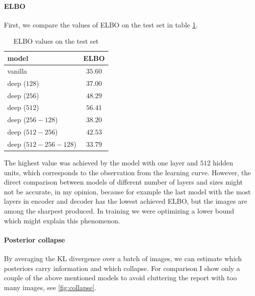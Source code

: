 \documentclass[a4paper,11pt]{article}
\begin{document}
\paragraph{ELBO} First, we compare the values of ELBO on the test set in table \ref{tab:elbo}.

\begin{table}[ht]
    \centering
    \begin{tabular}{| l | c |}
        \hline
        \textbf{model}       & \textbf{ELBO} \\
        \hline
        \hline
        vanilla              & $35.60$       \\
        \hline
        deep ($128$)         & $37.00$       \\
        \hline
        deep ($256$)         & $48.29$       \\
        \hline
        deep ($512$)         & $56.41$       \\
        \hline
        deep ($256-128$)     & $38.20$       \\
        \hline
        deep ($512-256$)     & $42.53$       \\
        \hline
        deep ($512-256-128$) & $33.79$       \\
        \hline
    \end{tabular}
    \caption{ELBO values on the test set}
    \label{tab:elbo}
\end{table}

The highest value was achieved by the model with one layer and $512$ hidden units, which corresponds to the observation from the learning curve.
However, the direct comparison between models of different number of layers and sizes might not be accurate, in my opinion, because for example the last model with the most layers in encoder and decoder has the lowest achieved ELBO, but the images are among the sharpest produced.
In training we were optimizing a lower bound which might explain this phenomenon.

\paragraph{Posterior collapse} By averaging the KL divergence over a batch of images, we can estimate which posteriors carry information and which collapse.
For comparison I show only a couple of the above mentioned models to avoid cluttering the report with too many images, see \ref{fig:collapse}.
\end{document}
